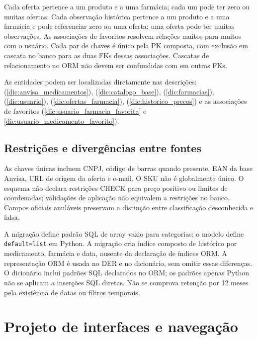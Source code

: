 Cada oferta pertence a um produto e a uma farmácia; cada um pode ter zero ou muitas ofertas. Cada observação histórica pertence a um produto e a uma farmácia e pode referenciar zero ou uma oferta; uma oferta pode ter muitas observações. As associações de favoritos resolvem relações muitos-para-muitos com o usuário. Cada par de chaves é único pela PK composta, com exclusão em cascata no banco para as duas FKs dessas associações. Cascatas de relacionamento no ORM não devem ser confundidas com  em outras FKs.

As entidades podem ser localizadas diretamente nas descrições:  (\ref{dic:anvisa_medicamentos}),  (\ref{dic:catalogo_base}),  (\ref{dic:farmacias}),  (\ref{dic:usuario}),  (\ref{dic:ofertas_farmacia}),  (\ref{dic:historico_precos}) e as associações de favoritos (\ref{dic:usuario_farmacia_favorita} e \ref{dic:usuario_medicamento_favorito}).

\subsection{Restrições e divergências entre fontes}

As chaves únicas incluem CNPJ, código de barras quando presente, EAN da base Anvisa, URL de origem da oferta e e-mail. O SKU não é globalmente único. O esquema não declara restrições CHECK para preço positivo ou limites de coordenadas; validações de aplicação não equivalem a restrições no banco. Campos oficiais anuláveis preservam a distinção entre classificação desconhecida e falsa.

A migração  define padrão SQL de array vazio para categorias; o modelo define \texttt{default=list} em Python. A migração  cria índice composto de histórico por medicamento, farmácia e data, ausente da declaração de índices ORM. A representação ORM é usada no DER e no dicionário, sem omitir essas diferenças. O dicionário inclui padrões SQL declarados no ORM; os padrões apenas Python não se aplicam a inserções SQL diretas. Não se comprova retenção por 12 meses pela existência de datas ou filtros temporais.



\section{Projeto de interfaces e navegação}\label{sec:interfaces}


